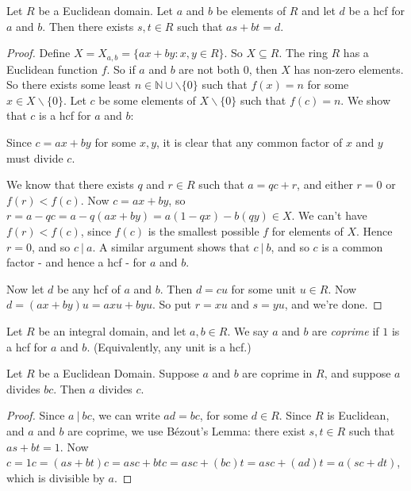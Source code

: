 \documentclass[10pt]{scrartcl}
\begin{document}
 \begin{lemma}   Let $R$ be a Euclidean domain. Let $a$ and $b$ be elements of $R$ and let $d$ be a hcf for $a$ and $b$. Then there exists $s,t\in R$ such that $as + bt = d$.	
 \end{lemma}

 
 \begin{proof}
 	Define $X = X_{a,b} = \{ax + by : x,y \in R\}$. So $X \subseteq R$. The ring $R$ has a Euclidean function $f$. So if $a$ and $b$ are not both $0$, then $X$ has non-zero elements. So there exists some least $n \in \mathbb{N}\cup\backslash\{0\}$ such that $f(x) = n$ for some $x \in X\backslash\{0\}.$ Let $c$ be some elements of $X \backslash\{0\}$ such that $f(c) = n$. We show that $c$ is a hcf for $a$ and $b$:
 	
 	Since $c = ax + by$ for some $x,y$, it is clear that any common factor of $x$ and $y$ must divide $c$.
 	
 	We know that there exists $q$ and $r\in R$ such that $a = qc + r$, and either $ r = 0$ or $f(r) < f(c)$. Now $c = ax + by$, so $r = a -qc = a - q(ax + by) = a(1-qx) -b(qy) \in X$. We can't have $f(r) < f(c)$, since $f(c)$ is the smallest possible $f$ for elements of $X$. Hence $r = 0$, and so $c~|~ a$. A similar argument shows that $c ~|~ b$, and so $c$ is a common factor - and hence a hcf - for $a$ and $b$.
 	
 	Now let $d$ be any hcf of $a$ and $b$. Then $d =  cu$ for some unit $u \in R$. Now $d = (ax + by)u = axu + byu$. So put $r = xu$ and $s = yu$, and we're done.
 \end{proof}

 
 \vspace*{5pt}
 
\begin{definition}Let $R$ be an integral domain, and let $a,b \in R$. We say $a$ and $b$ are \emph{coprime}  if $1$ is a hcf for $a$ and $b$. (Equivalently, any unit is a hcf.)	
\end{definition}\vspace*{5pt}
 
 \begin{proposition} Let $R$ be a Euclidean Domain. Suppose $a$ and $b$ are coprime in $R$, and suppose $a$ divides $bc$. Then $a$ divides $c$.
\end{proposition}

 \begin{proof}
 Since $a ~|~ bc$, we can write $ad = bc$, for some $d \in R$. Since $R$ is Euclidean, and $a$ and $b$ are coprime, we use B\'{e}zout's Lemma: there exist $s,t \in R$ such that $as + bt = 1$. Now $c = 1c = (as + bt)c = asc + btc = asc + (bc)t = asc + (ad)t = a(sc + dt)$, which is divisible by $a$. 
 \end{proof}\vspace*{5pt}
 
\end{document}
